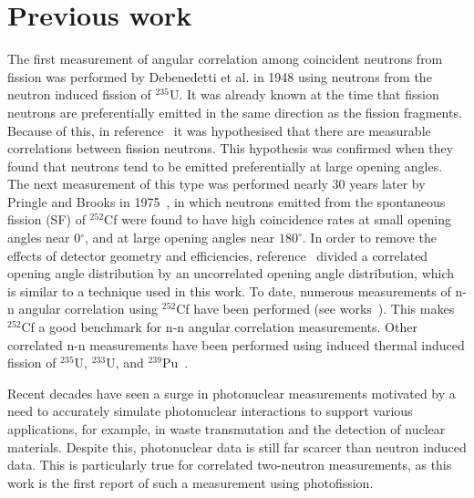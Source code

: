 \section{Previous work}
The first measurement of angular correlation among coincident neutrons from fission was performed by Debenedetti et al. \cite{1948twoNCorr} in 1948 using neutrons from the neutron induced fission of $^{235}\text{U}$.
It was already known at the time that fission neutrons are preferentially emitted in the same direction as the fission fragments.
Because of this, in reference~\cite{1948twoNCorr} it was hypothesised that there are measurable correlations between fission neutrons.
This hypothesis was confirmed when they found that neutrons tend to be emitted preferentially at large opening angles.
The next measurement of this type was performed nearly 30 years later by Pringle and Brooks in 1975~\cite{1975Cf252}, in which neutrons emitted from the spontaneous fission (SF) of $^{252}$Cf were found to have high coincidence rates at small opening angles near 0$^{\circ}$, and at large opening angles near $180^{\circ}$.
In order to remove the effects of detector geometry and efficiencies, reference~\cite{1975Cf252} divided a correlated opening angle distribution by an uncorrelated opening angle distribution, which is similar to a technique used in this work.
To date, numerous measurements of n-n angular correlation using $^{252}$Cf have been performed (see works~\cite{1975Cf252, 2008CF252, Pozzi2014}).
This makes $^{252}$Cf a good benchmark for n-n angular correlation measurements.
Other correlated n-n measurements have been performed using induced thermal induced fission of $^{235}$U, $^{233}$U, and $^{239}$Pu~\cite{Sokolov2010}.

Recent decades have seen a surge in photonuclear measurements motivated by a need to accurately simulate photonuclear interactions to support various applications, for example, in waste transmutation and the detection of nuclear materials.
Despite this, photonuclear data is still far scarcer than neutron induced data.
This is particularly true for correlated two-neutron measurements, as this work is the first report of such a measurement using photofission.